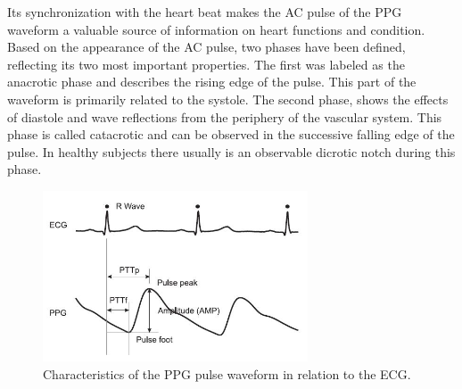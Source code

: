 Its synchronization with the heart beat makes the AC pulse of the PPG waveform a valuable source of information on heart functions and condition. Based on the appearance of the AC pulse, two phases have been defined, reflecting its two most important properties. The first was labeled as the anacrotic phase and describes the rising edge of the pulse. This part of the waveform is primarily related to the systole. The second phase, shows the effects of diastole and wave reflections from the periphery of the vascular system. This phase is called catacrotic and can be observed in the successive falling edge of the pulse. In healthy subjects there usually is an observable dicrotic notch during this phase.

\begin{figure}[h!]
	\centering
  \includegraphics[width=0.7\textwidth, angle=0]{images/ppg_pw.jpg}
	\caption[PPG Pulse Characteristics]{Characteristics of the PPG pulse waveform in relation to the ECG.}
	\label{ppg_pw}
\end{figure}

